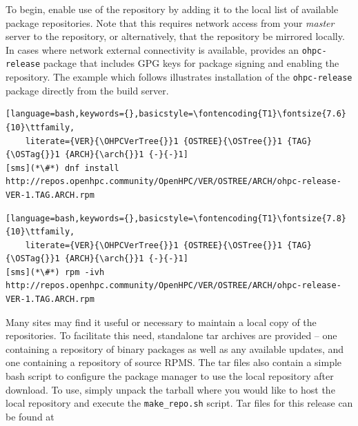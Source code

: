 To begin, enable use of the \OHPC{} repository by adding it to the local list
of available package repositories. Note that this requires network access from
your {\em master} server to the \OHPC{} repository, or alternatively, that
the \OHPC{} repository be mirrored locally.  In cases where network external
connectivity is available, \OHPC{} provides an \texttt{ohpc-release} package
that includes GPG keys for package signing and enabling the repository.  The
example which follows illustrates installation of the \texttt{ohpc-release}
package directly from the \OHPC{} build server.

\begin{lstlisting}[language=bash,keywords={},basicstyle=\fontencoding{T1}\fontsize{7.6}{10}\ttfamily,
	literate={VER}{\OHPCVerTree{}}1 {OSTREE}{\OSTree{}}1 {TAG}{\OSTag{}}1 {ARCH}{\arch{}}1 {-}{-}1]
[sms](*\#*) dnf install http://repos.openhpc.community/OpenHPC/VER/OSTREE/ARCH/ohpc-release-VER-1.TAG.ARCH.rpm
\end{lstlisting}
\else
\begin{lstlisting}[language=bash,keywords={},basicstyle=\fontencoding{T1}\fontsize{7.8}{10}\ttfamily,
	literate={VER}{\OHPCVerTree{}}1 {OSTREE}{\OSTree{}}1 {TAG}{\OSTag{}}1 {ARCH}{\arch{}}1 {-}{-}1]
[sms](*\#*) rpm -ivh http://repos.openhpc.community/OpenHPC/VER/OSTREE/ARCH/ohpc-release-VER-1.TAG.ARCH.rpm
\end{lstlisting}
\fi

\begin{center}
\begin{tcolorbox}[]
\small Many sites may find it useful or necessary to maintain a local copy of the
\OHPC{} repositories. To facilitate this need, standalone tar
archives are provided -- one containing a repository of binary packages as well as any
available updates, and one containing a repository of source RPMS. The tar files
also contain a simple bash script to configure the package manager to use the
local repository after download. To use, simply unpack the tarball where you
would like to host the local repository and execute the \texttt{make\_repo.sh} script.
Tar files for this release can be found at \href{http://repos.openhpc.community/dist/\OHPCVersion}
        {\color{blue}{http://repos.openhpc.community/dist/\OHPCVersion}}
\end{tcolorbox}
\end{center}
